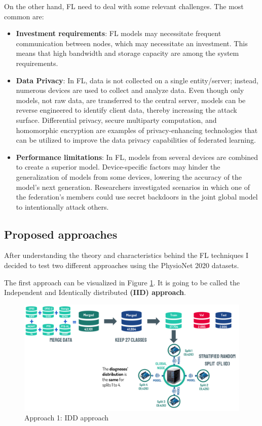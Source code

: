On the other hand, FL need to deal with some relevant challenges. The most common are:

\begin{itemize}
    \item \textbf{Investment requirements}: FL models may necessitate frequent communication between nodes, which may necessitate an investment. This means that high bandwidth and storage capacity are among the system requirements.
    
    \item \textbf{Data Privacy}: In FL, data is not collected on a single entity/server; instead, numerous devices are used to collect and analyze data. Even though only models, not raw data, are transferred to the central server, models can be reverse engineered to identify client data, thereby increasing the attack surface. Differential privacy, secure multiparty computation, and homomorphic encryption are examples of privacy-enhancing technologies that can be utilized to improve the data privacy capabilities of federated learning.
    
    \item \textbf{Performance limitations}: In FL, models from several devices are combined to create a superior model. Device-specific factors may hinder the generalization of models from some devices, lowering the accuracy of the model's next generation. Researchers investigated scenarios in which one of the federation's members could use secret backdoors in the joint global model to intentionally attack others.
\end{itemize}

\subsection{Proposed approaches} \label{proposed_approaches}

After understanding the theory and characteristics behind the FL techniques I decided to test two different approaches using the PhysioNet 2020 datasets.

The first approach can be visualized in Figure \ref{fig:fl_approach1}. It is going to be called the Independent and Identically distributed \textbf{(IID) approach}. 

\begin{figure}[H]
\centering
\includegraphics[scale=0.4]{img/fl_approach1.png}
\caption{Approach 1: IDD approach}
\label{fig:fl_approach1}
\end{figure}


